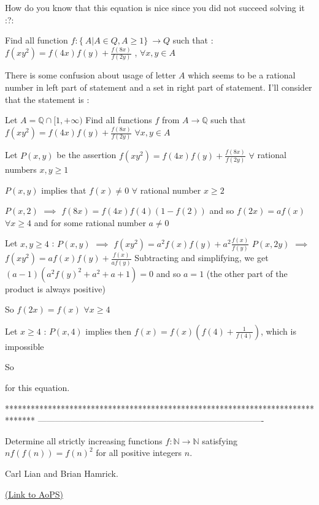 \begin{solution}
	How do you know that this equation is nice since you did not succeed solving it :?:

\begin{tcolorbox}Find all function $f: \{\ A|A\in Q , A\geq{1}\}\ \to Q$ such that : $f(xy^2)=f(4x)f(y)+\frac{f(8x)}{f(2y)}$ , $\forall x,y \in A$\end{tcolorbox}
There is some confusion about usage of letter $A$ which seems to be a rational number in left part of statement and a set in right part of statement.
I'll consider that the statement is :

Let $A=\mathbb Q\cap[1,+\infty)$
Find all functions $f$ from $A\to\mathbb Q$ such that $f(xy^2)=f(4x)f(y)+\frac{f(8x)}{f(2y)}$ $\forall x,y\in A$

Let $P(x,y)$ be the assertion $f(xy^2)=f(4x)f(y)+\frac{f(8x)}{f(2y)}$ $\forall$ rational numbers $x,y\ge 1$

$P(x,y)$ implies that $f(x)\ne 0$ $\forall$ rational number $x\ge 2$

$P(x,2)$ $\implies$ $f(8x)=f(4x)f(4)(1-f(2))$ and so $f(2x)=af(x)$ $\forall x\ge 4$ and for some rational number $a\ne 0$


Let $x,y\ge 4$ : 
$P(x,y)$ $\implies$ $f(xy^2)=a^2f(x)f(y)+a^2\frac{f(x)}{f(y)}$
$P(x,2y)$ $\implies$ $f(xy^2)=af(x)f(y)+\frac{f(x)}{af(y)}$
Subtracting and simplifying, we get $(a-1)(a^2f(y)^2+a^2+a+1)=0$ and so $a=1$ (the other part of the product is always positive)

So $f(2x)=f(x)$ $\forall x\ge 4$

Let $x\ge 4$ : $P(x,4)$ implies then $f(x)=f(x)\left(f(4)+\frac{1}{f(4)}\right)$, which is impossible 

So  for this equation.
\end{solution}
*******************************************************************************
-------------------------------------------------------------------------------

\begin{problem}
	Determine all strictly increasing functions $f: \mathbb{N}\to\mathbb{N}$ satisfying $nf(f(n))=f(n)^2$ for all positive integers $n$.

\begin{italicized}Carl Lian and Brian Hamrick.\end{italicized}
	\flushright \href{https://artofproblemsolving.com/community/c6h487455}{(Link to AoPS)}
\end{problem}



